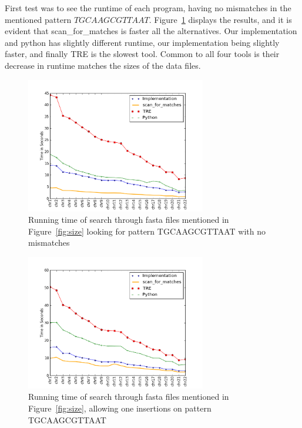 \newpage

First test was to see the runtime of each program, having no mismatches in the mentioned pattern $TGCAAGCGTTAAT$. Figure~\ref{fig:0miss} displays the results, and it is evident that scan\_for\_matches is faster all the alternatives. Our implementation and python has slightly different runtime, our implementation being slightly faster, and finally TRE is the slowest tool. Common to all four tools is their decrease in runtime matches the sizes of the data files.

\begin{figure}[h!]
\centering
\includegraphics[width=0.7\textwidth]{Benchmarking/0miss.png}
\caption{Running time of search through fasta files mentioned in Figure~\ref{fig:size} looking for pattern TGCAAGCGTTAAT with no mismatches}
\label{fig:0miss}
\end{figure}


\begin{figure}[h!]
\centering
\includegraphics[width=0.7\textwidth]{Benchmarking/1ins.png}
\caption{Running time of search through fasta files mentioned in Figure~\ref{fig:size},  allowing one insertions on pattern TGCAAGCGTTAAT}
\label{fig:ins1}
\end{figure}



